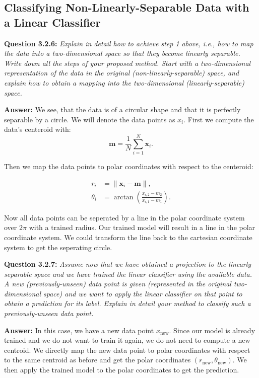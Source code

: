 \documentclass{article}
\begin{document}
\begin{multicols}{2}
    \section{Classifying Non-Linearly-Separable Data with a Linear Classifier}

    \noindent \textbf{Question 3.2.6:}  
    \textit{Explain in detail how to achieve step 1 above, i.e., how to map the data into a two-dimensional space so that they become linearly separable. Write down all the steps of your proposed method. Start with a two-dimensional representation of the data in the original (non-linearly-separable) space, and explain how to obtain a mapping into the two-dimensional (linearly-separable) space.}
    
    \textbf{Answer:}
    We see, that the data is of a circular shape and that it is perfectly separable by a circle. We will denote the data points as $x_i$. First we compute the data's centeroid with:
    \begin{equation*}
        \mathbf{m} = \frac{1}{N} \sum_{i=1}^N \mathbf{x}_i.
    \end{equation*}

    Then we map the data points to polar coordinates with respect to the centeroid:

    \begin{align*}
        r_i &= \|\mathbf{x}_i - \mathbf{m}\|, \\
        \theta_i &= \arctan\left(\frac{x_{i,2} - m_2}{x_{i,1} - m_1}\right).
    \end{align*}

    Now all data points can be seperated by a line in the polar coordinate system over $2\pi$ with a trained radius. Our trained model will result in a line in the polar coordinate system. We could transform the line back to the cartesian coordinate system to get the seperating circle.

    \vspace{0.5cm}
    \noindent \textbf{Question 3.2.7:}  
    \textit{Assume now that we have obtained a projection to the linearly-separable space and we have trained the linear classifier using the available data. A new (previously-unseen) data point is given (represented in the original two-dimensional space) and we want to apply the linear classifier on that point to obtain a prediction for its label. Explain in detail your method to classify such a previously-unseen data point.}
    
    \textbf{Answer:}
    In this case, we have a new data point \( x_{\text{new}} \). Since our model is already trained and we do not want to train it again, we do not need to compute a new centroid. We directly map the new data point to polar coordinates with respect to the same centroid as before and get the polar coordinates \( (r_{\text{new}}, \theta_{\text{new}}) \). We then apply the trained model to the polar coordinates to get the prediction.


\end{multicols}
\end{document}
